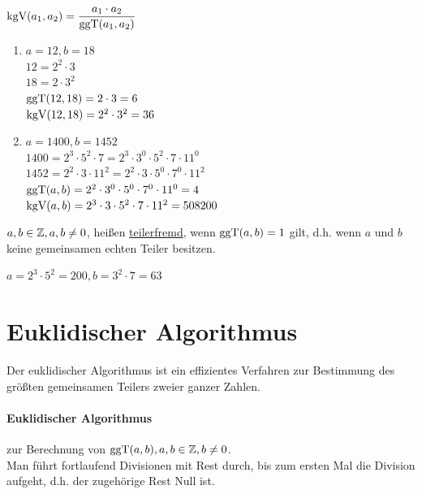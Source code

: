 \Bem $\mathbin\text{kgV}(a_1,a_2)=\dfrac{a_1\cdot a_2}{\mathbin\text{ggT}(a_1,a_2)}$


\Bsps
\begin{enumerate}
	\item $a=12, b=18$\\
	$12 = 2^2\cdot 3$\\
	$18 = 2\cdot 3^2$\\
	$\mathbin\text{ggT}(12,18)=2\cdot3=6$\\
	$\mathbin\text{kgV}(12,18)=2^2\cdot3^2=36$
	
	\item $a=1400, b=1452$\\
	$1400 = 2^3\cdot 5^2\cdot 7 =  2^3\cdot 3^0\cdot 5^2\cdot 7\cdot 11^0$\\
	$1452 = 2^2\cdot 3\cdot 11^2 = 2^2\cdot 3\cdot 5^0\cdot 7^0\cdot 11^2$\\
	$\mathbin\text{ggT}(a,b)=2^2\cdot 3^0\cdot 5^0\cdot 7^0\cdot 11^0=4$\\
	$\mathbin\text{kgV}(a,b)=2^3\cdot 3\cdot 5^2\cdot 7\cdot 11^2=508200$
\end{enumerate}

\Def $a,b\in\mathbb{Z},a,b\ne0$, heißen \ul{teilerfremd}, wenn $\mathbin\text{ggT}(a,b)=1$ gilt, d.h. wenn $a$ und $b$ keine gemeinsamen echten Teiler besitzen.

\Bsp $a=2^3\cdot5^2=200, b=3^2\cdot7=63$

\clearpage
\section{Euklidischer Algorithmus}
Der euklidischer Algorithmus ist ein effizientes Verfahren zur Bestimmung des größten gemeinsamen Teilers zweier ganzer Zahlen.

\paragraph{Euklidischer Algorithmus}
zur Berechnung von $\mathbin\text{ggT}(a,b),a,b\in\mathbb{Z}, b\ne0$.\\
Man führt fortlaufend Divisionen mit Rest durch, bis zum ersten Mal die Division aufgeht, d.h. der zugehörige Rest Null ist.

